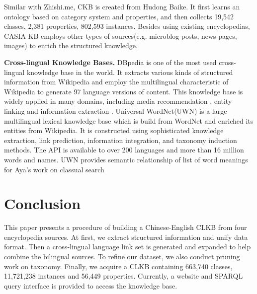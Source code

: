 \documentclass[runningheads,a4paper]{llncs}
\newcommand{\para}[1]{\vspace{0.1cm}\noindent\textbf{#1}}
\begin{document}
\begin{CJK*}{UTF8}{song}
Similar with Zhishi.me, CKB\cite{wang2012building} is created from Hudong Baike. It first learns an ontology based on category system and properties, and then collects 19,542 classes, 2,381 properties, 802,593 instances. Besides using existing encyclopedias, CASIA-KB employs other types of sources(e.g. microblog posts, news pages, images) to enrich the structured knowledge.

\para{Cross-lingual Knowledge Bases.} DBpedia \cite{auer2007dbpedia,mendes2012dbpedia} is one of the most used cross-lingual knowledge base in the world. It extracts various kinds of structured information from Wikipedia and employ the multilingual characteristic of Wikipedia to generate 97 language versions of content. This knowledge base is widely applied in many domains, including media recommendation \cite{fernandez2011generic,kaminskas2012knowledge}, entity linking\cite{mendes2011evaluating} and information extraction \cite{dutta2013integrating}. Universal WordNet(UWN)\cite{de2012uwn} is a large multilingual lexical knowledge base which is build from WordNet and enriched its entities from Wikipedia. It is constructed using sophisticated knowledge extraction, link prediction, information integration, and taxonomy induction methods. The API is available to over 200 languages and more than 16 million words and names. UWN provides semantic relationship of list of word meanings for Aya's work on classual search \cite{al2015conceptual}


\section{Conclusion}
\label{sec:con}
This paper presents a procedure of building a Chinese-English CLKB from four encyclopedia sources. At first, we extract structured information and unify data format. Then a cross-lingual language link set is generated and expanded to help combine the bilingual sources. To refine our dataset, we also conduct pruning work on taxonomy. Finally, we acquire a CLKB containing 663,740 classes, 11,721,238 instances and 56,449 properties. Currently, a website and SPARQL query interface is provided to access the knowledge base.


\end{CJK*}
\end{document}
